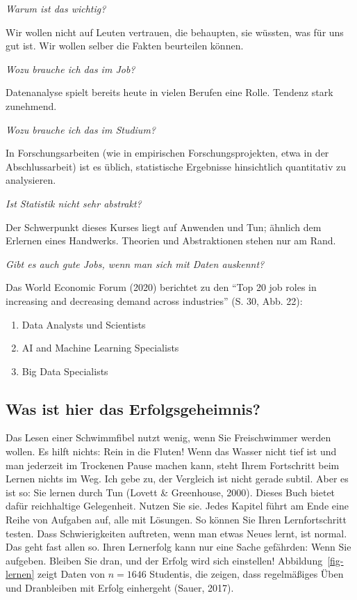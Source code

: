 \documentclass[
  letterpaper,
  twoside,
  open=any]{scrbook}
\providecommand{\tightlist}{%
  \setlength{\itemsep}{0pt}\setlength{\parskip}{0pt}}\usepackage{longtable,booktabs,array}
\theoremstyle{definition}
\theoremstyle{definition}
\theoremstyle{definition}
\theoremstyle{remark}
\begin{document}
\emph{Warum ist das wichtig?}

Wir wollen nicht auf Leuten vertrauen, die behaupten, sie wüssten, was
für uns gut ist. Wir wollen selber die Fakten beurteilen können.

\emph{Wozu brauche ich das im Job?}

Datenanalyse spielt bereits heute in vielen Berufen eine Rolle. Tendenz
stark zunehmend.

\emph{Wozu brauche ich das im Studium?}

In Forschungsarbeiten (wie in empirischen Forschungsprojekten, etwa in
der Abschlussarbeit) ist es üblich, statistische Ergebnisse hinsichtlich
quantitativ zu analysieren.

\emph{Ist Statistik nicht sehr abstrakt?}

Der Schwerpunkt dieses Kurses liegt auf Anwenden und Tun; ähnlich dem
Erlernen eines Handwerks. Theorien und Abstraktionen stehen nur am Rand.

\emph{Gibt es auch gute Jobs, wenn man sich mit Daten auskennt?}

Das World Economic Forum (2020) berichtet zu den \enquote{Top 20 job
roles in increasing and decreasing demand across industries} (S. 30,
Abb. 22):

\begin{enumerate}
\def\labelenumi{\arabic{enumi}.}
\tightlist
\item
  Data Analysts und Scientists
\item
  AI and Machine Learning Specialists
\item
  Big Data Specialists
\end{enumerate}

\subsection{Was ist hier das
Erfolgsgeheimnis?}\label{was-ist-hier-das-erfolgsgeheimnis}

Das Lesen einer Schwimmfibel nutzt wenig, wenn Sie Freischwimmer werden
wollen. Es hilft nichts: Rein in die Fluten! Wenn das Wasser nicht tief
ist und man jederzeit im Trockenen Pause machen kann, steht Ihrem
Fortschritt beim Lernen nichts im Weg. Ich gebe zu, der Vergleich ist
nicht gerade subtil. Aber es ist so: Sie lernen durch Tun (Lovett \&
Greenhouse, 2000). Dieses Buch bietet dafür reichhaltige Gelegenheit.
Nutzen Sie sie. Jedes Kapitel führt am Ende eine Reihe von Aufgaben auf,
alle mit Lösungen. So können Sie Ihren Lernfortschritt testen. Dass
Schwierigkeiten auftreten, wenn man etwas Neues lernt, ist normal. Das
geht fast allen so. Ihren Lernerfolg kann nur eine Sache gefährden: Wenn
Sie aufgeben. Bleiben Sie dran, und der Erfolg wird sich einstellen!
Abbildung~\ref{fig-lernen} zeigt Daten von \(n=1646\) Studentis, die
zeigen, dass regelmäßiges Üben und Dranbleiben mit Erfolg einhergeht
(Sauer, 2017).
\end{document}
